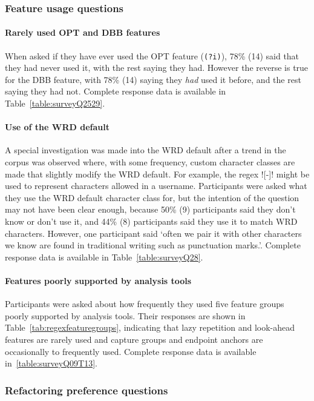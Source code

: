 

\subsubsection{Feature usage questions}

\paragraph{Rarely used OPT and DBB features}  When asked if they have ever used the OPT feature (\verb!(?i)!), 78\% (14) said that they had never used it, with the rest saying they had.  However the reverse is true for the DBB feature, with 78\% (14) saying they \emph{had} used it before, and the rest saying they had not.  Complete response data is available in Table~\ref{table:surveyQ2529}.

\paragraph{Use of the WRD default}  A special investigation was made into the WRD default after a trend in the corpus was observed where, with some frequency, custom character classes are made that slightly modify the WRD default.  For example, the regex \cverb![\w-]! might be used to represent characters allowed in a username.
Participants were asked what they use the WRD default character class for, but the intention of the question may not have been clear enough, because 50\% (9) participants said they don't know or don't use it, and 44\% (8) participants said they use it to match WRD characters.  However, one participant said `often we pair it with other characters we know are found in traditional writing such as punctuation marks.'.  Complete response data is available in Table~\ref{table:surveyQ28}.

\paragraph{Features poorly supported by analysis tools} Participants were asked about how frequently they used five feature groups poorly supported by analysis tools.  Their responses are shown in Table~\ref{tab:regexfeaturegroups}, indicating that lazy repetition and look-ahead features are rarely used and capture groups and endpoint anchors are occasionally to frequently used. Complete response data is available in~\ref{table:surveyQ09T13}.

\subsubsection{Refactoring preference questions}
